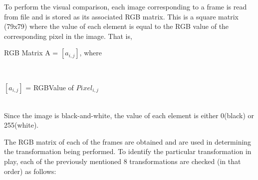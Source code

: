 \documentclass[10pt, letter]{article}
\begin{document}
To perform the visual comparison, each image corresponding to a frame is read from file and is stored as its associated RGB matrix. This is a square matrix (79x79) where the value of each element is equal to the RGB value of the corresponding pixel in the image. That is,\\
	\centerline{RGB Matrix A = $[a_{i,j}]$, where}\\
	\centerline{$[a_{i,j}]$ = RGBValue of $Pixel_{i,j}$ }\\
Since the image is black-and-white, the value of each element is either 0(black) or 255(white).

The RGB matrix of each of the frames are obtained and are used in determining the transformation being performed. To identify the particular transformation in play, each of the previously mentioned 8 transformations are checked (in that order) as follows:
\end{document}
